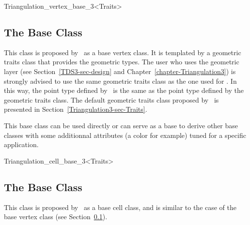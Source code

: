 	\begin{ccClassTemplate}{Triangulation_vertex_base_3<Traits>}
	\subsection{The Base Class \protect {} }
	\label{TDS3-sec-class-Base_Vertex}

This class is proposed by \cgal\ as a base vertex class. It is
templated by a geometric traits class  that provides the
geometric types. The user who uses the geometric layer (see
Section~\ref{TDS3-sec-design} and
Chapter~\ref{chapter-Triangulation3}) is strongly advised to use the
same geometric traits class  as the one used for
. In this way, the point type
defined by \ccClassTemplateName\ is the same as the point type defined by the
geometric traits class. The default geometric traits class proposed by 
\cgal\ is presented in Section~\ref{Triangulation3-sec-Traits}.

This base class can be used directly or can serve as a base to derive
other base classes with some additionnal attributes (a color for
example) tuned for a specific application.


	\end{ccClassTemplate} 

	\begin{ccClassTemplate}{Triangulation_cell_base_3<Traits>}
	\subsection{The Base Class \protect {}}

This class is proposed by \cgal\ as a base cell class, and is similar
to the case of the base vertex class (see
Section~\ref{TDS3-sec-class-Base_Vertex}).


	\end{ccClassTemplate} 
